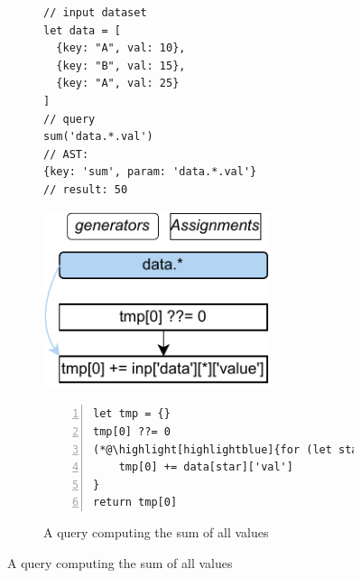\documentclass[runningheads]{llncs}
\begin{document}
\begin{figure}[t!]
\begin{subfigure}{\textwidth}
\begin{minipage}{0.33\textwidth}
\begin{lstlisting}[style=JavaScriptTiny, columns=flexible]
// input dataset
let data = [
  {key: "A", val: 10},
  {key: "B", val: 15},
  {key: "A", val: 25}
]
// query
sum('data.*.val')
// AST:
{key: 'sum', param: 'data.*.val'}
// result: 50
\end{lstlisting}
\end{minipage}
\begin{minipage}{0.27\textwidth}
\centering
\includegraphics[width=0.73\textwidth]{images/intro_q1_ir.pdf}
\end{minipage}
\begin{minipage}{0.38\textwidth}
\begin{lstlisting}[style=JavaScriptTiny, columns=flexible, numbers=left, xleftmargin=2pt]
let tmp = {}
tmp[0] ??= 0
(*@\highlight[highlightblue]{for (let star in data) }@*) {
    tmp[0] += data[star]['val']
}
return tmp[0]
\end{lstlisting}
\end{minipage}
\caption{A query computing the sum of all values}\label{fig:intro_q1}
\end{subfigure}


\end{figure}
\end{document}
